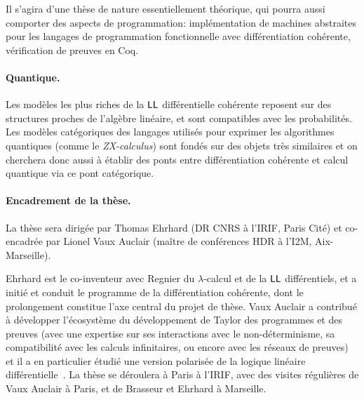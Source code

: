 \documentclass[a4]{article}
\begin{document}
Il s'agira d'une thèse de nature essentiellement théorique, qui pourra
aussi comporter des aspects de programmation: implémentation de
machines abstraites pour les langages de programmation fonctionnelle
avec différentiation cohérente, vérification de preuves en Coq.

\paragraph*{Quantique.}
Les modèles les plus riches de la $\hbox{\textsf{LL}}$ différentielle cohérente
reposent sur des structures proches de l'algèbre linéaire, et sont
compatibles avec les probabilités.
%
Les modèles catégoriques des langages utilisés pour exprimer
les algorithmes quantiques (comme le \emph{ZX-calculus}) sont fondés
sur des objets très similaires et on cherchera donc aussi à établir
des ponts entre différentiation cohérente et calcul quantique via ce
pont catégorique.

\paragraph*{Encadrement de la thèse.}
La thèse sera dirigée par Thomas Ehrhard (DR CNRS à l’IRIF, Paris
Cité) et co-encadrée par Lionel Vaux Auclair (maître de conférences HDR à
l’I2M, Aix-Marseille).

Ehrhard est le co-inventeur avec Regnier du $\lambda$-calcul et de la $\hbox{\textsf{LL}}$
différentiels, et a initié et conduit le programme de la différentiation
cohérente, dont le prolongement constitue l’axe central du projet de thèse.
Vaux Auclair a contribué à développer l’écosystème du développement de Taylor
des programmes et des preuves (avec une expertise sur ses interactions avec le
non-déterminisme, sa compatibilité avec les calculs infinitaires, 
ou encore avec les réseaux de preuves) et il a en particulier étudié une
version polarisée de la logique linéaire diffé\-ren\-tielle~\cite{Vaux09a}.
%
La thèse se déroulera à Paris à l’IRIF, avec des visites régulières de Vaux
Auclair à Paris, et de Brasseur et Ehrhard à Marseille.



\end{document}
